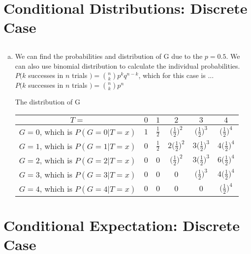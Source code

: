 \documentclass[10pt]{report}
\begin{document}
\section{\sc\color{cit}Conditional Distributions: Discrete Case}
\setcounter{subsection}{1}
\subsection{}
 \begin{enumerate}[(a)]
 \item We can find the probabilities and distribution of G due to the $p=0.5 $. We can also use binomial distribution to calculate the individual probabilities.\\ $P(k $ successes in $n$ trials $) = \binom{n}{k} p^k q^{n-k} $, which for this case is ... \\
 $P(k $ successes in $n$ trials $) = \binom{n}{k} p^n $
\begin{center}
The distribution of G 
 \begin{tabular}{|c|c|c|c|c|c|}
 \hline
 $T=$ & $0$ & $1$ & $2$ & $3$ & $4$ \\
 \hline
 $G = 0$, which is $P(G=0 | T= x) $ & $1$ & $\frac{1}{2}$ &$ \bigg(\frac{1}{2}\bigg) ^ 2 $ & $ \bigg(\frac{1}{2}\bigg) ^ 3 $ & $ \bigg(\frac{1}{2}\bigg) ^ 4 $ \\
 \hline
 $G = 1$, which is $P(G=1 | T= x) $ & $0$ & $\frac{1}{2}$ &$ 2\bigg(\frac{1}{2}\bigg) ^ 2 $ & $ 3\bigg(\frac{1}{2}\bigg) ^ 3 $ & $ 4\bigg(\frac{1}{2}\bigg) ^ 4 $ \\
 \hline
 $G = 2$, which is $P(G=2 | T= x) $ & $0$ & $0$ &$ \bigg(\frac{1}{2}\bigg) ^ 2 $ & $ 3\bigg(\frac{1}{2}\bigg) ^ 3 $ & $6 \bigg(\frac{1}{2}\bigg) ^ 4 $ \\
 \hline
 $G = 3$, which is $P(G=3 | T= x) $ & $0$ & $0$ &$ 0$ & $ \bigg(\frac{1}{2}\bigg) ^ 3 $ & $ 4\bigg(\frac{1}{2}\bigg) ^ 4 $ \\
 \hline
 $G = 4$, which is $P(G=4 | T= x) $ & $0$ & $0$ &$ 0$ & $0$ & $ \bigg(\frac{1}{2}\bigg) ^ 4 $ \\
 \hline
 \end{tabular}
 \end{center}
 \end{enumerate}
 \section{\sc\color{cit}Conditional Expectation: Discrete Case}
\setcounter{subsection}{3}
\end{document}
